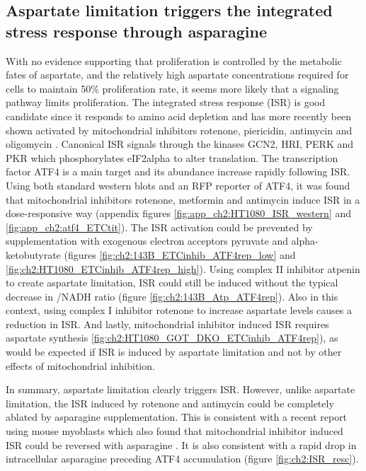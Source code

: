 \subsection{Aspartate limitation triggers the integrated stress response through asparagine}
With no evidence supporting that proliferation is controlled by the metabolic fates of aspartate, and the relatively high aspartate concentrations required for cells to maintain 50\% proliferation rate, it seems more likely that a signaling pathway limits proliferation.
The integrated stress response (ISR) is good candidate since it responds to amino acid depletion \cite{Darnell2018-lp} and has more recently been shown activated by mitochondrial inhibitors rotenone, piericidin, antimycin and oligomycin \cite{Guo2020-ia, Mick2020-kf, Condon2021-nz}.
Canonical ISR signals through the kinases GCN2, HRI, PERK and PKR which phosphorylates eIF2alpha to alter translation.
The transcription factor ATF4 is a main target and its abundance increase rapidly following ISR.
Using both standard western blots and an RFP reporter of ATF4, it was found that mitochondrial inhibitors rotenone, metformin and antimycin induce ISR in a dose-responsive way (appendix figures \ref{fig:app_ch2:HT1080_ISR_western} and \ref{fig:app_ch2:atf4_ETCtit}).
The ISR activation could be prevented by supplementation with exogenous electron acceptors pyruvate and alpha-ketobutyrate (figures \ref{fig:ch2:143B_ETCinhib_ATF4rep_low} and \ref{fig:ch2:HT1080_ETCinhib_ATF4rep_high}).
Using complex II inhibitor atpenin to create aspartate limitation, ISR could still be induced without the typical decrease in \NAD{}/NADH ratio (figure \ref{fig:ch2:143B_Atp_ATF4rep}).
Also in this context, using complex I inhibitor rotenone to increase aspartate levels \cite{Hart2023-gp} causes a reduction in ISR.
And lastly, mitochondrial inhibitor induced ISR requires aspartate synthesis \ref{fig:ch2:HT1080_GOT_DKO_ETCinhib_ATF4rep}), as would be expected if ISR is induced by aspartate limitation and not by other effects of mitochondrial inhibition.

In summary, aspartate limitation clearly triggers ISR.
However, unlike aspartate limitation, the ISR induced by rotenone and antimycin could be completely ablated by asparagine supplementation.
This is consistent with a recent report using mouse myoblasts which also found that mitochondrial inhibitor induced ISR could be reversed with asparagine \cite{Mick2020-kf}.
It is also consistent with a rapid drop in intracellular asparagine preceding ATF4 accumulation (figure \ref{fig:ch2:ISR_resc}).

